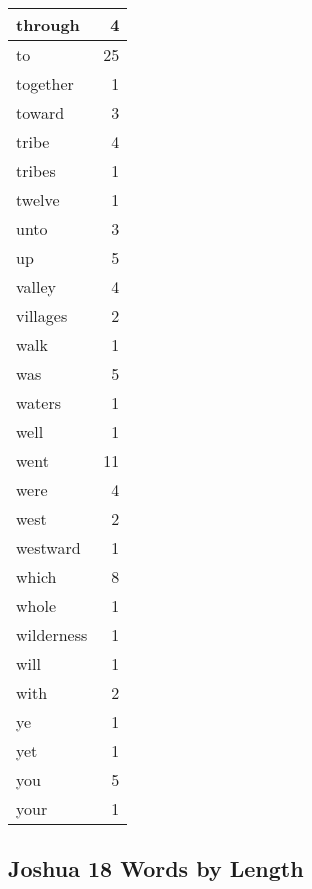 \begin{center}
\begin{longtable}{l|r}
through & 4\\ \hline 
to & 25\\ \hline 
together & 1\\ \hline 
toward & 3\\ \hline 
tribe & 4\\ \hline 
tribes & 1\\ \hline 
twelve & 1\\ \hline 
unto & 3\\ \hline 
up & 5\\ \hline 
valley & 4\\ \hline 
villages & 2\\ \hline 
walk & 1\\ \hline 
was & 5\\ \hline 
waters & 1\\ \hline 
well & 1\\ \hline 
went & 11\\ \hline 
were & 4\\ \hline 
west & 2\\ \hline 
westward & 1\\ \hline 
which & 8\\ \hline 
whole & 1\\ \hline 
wilderness & 1\\ \hline 
will & 1\\ \hline 
with & 2\\ \hline 
ye & 1\\ \hline 
yet & 1\\ \hline 
you & 5\\ \hline 
your & 1\\ \hline 
\end{longtable}
\end{center}





\subsection{Joshua 18 Words by Length}


\normalsize
 
